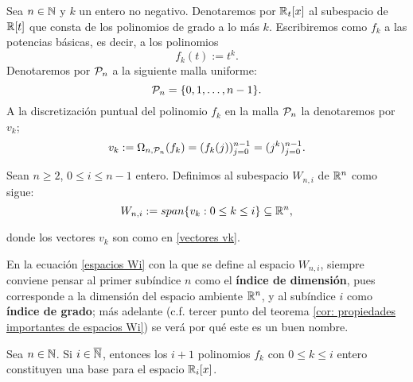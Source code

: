 \begin{notacion} \label{notacion: Pn, fk, Wi, vk}
Sea $n \in \mathbb{N}$ y $k$ un entero no negativo.
Denotaremos 
por $\mathbb{R}_{t}[x]$ al subespacio de $\mathbb{R}[t]$
que consta de los polinomios de grado a lo más $k$.
\noindent
Escribiremos como $f_{k}$ 
a las potencias básicas,
es decir, a los polinomios
\begin{equation}
\label{fk}
f_{k}(t):=t^{k}.
\end{equation}
Denotaremos por $\mathcal{P}_{n}$ a la siguiente
malla uniforme:
\begin{equation}
\label{malla Pn}
\mathcal{P}_{n}=\{ 0, 1, \ldots , n-1 \}.
\end{equation}
A la discretización puntual del
polinomio $f_{k}$ en la malla 
$\mathcal{P}_{n}$
la denotaremos por $v_{k}$;
\begin{equation}
\label{vectores vk}
v_{k}:= \Omega_{n, \mathcal{P}_{n}}(f_{k})
=(f_{k}(j))_{j=0}^{n-1}=(j^{k})_{j=0}^{n-1}.
\end{equation}
\end{notacion}

\begin{defi}
\label{def: espacis Wni}
Sean $n\geq 2$, $0 \leq i \leq n-1$ entero.
Definimos al subespacio 
$W_{n,i}$ de $\mathbb{R}^{n}$ como sigue:
\begin{equation}
\label{espacios Wi}
W_{n,i} := span\{ v_{k} : 0 \leq k \leq i \} \subseteq \mathbb{R}^{n},
\end{equation}

\noindent
donde los vectores $v_{k}$ son como en \ref{vectores vk}.
\end{defi}


En la ecuación \eqref{espacios Wi} con la que se
define al espacio $W_{n,i}$,
siempre conviene pensar al primer subíndice $n$
como el \textbf{índice de dimensión}, pues corresponde
a la dimensión del espacio ambiente $\mathbb{R}^{n}$,
y al subíndice $i$ como \textbf{índice de grado};
más adelante (c.f. tercer punto del teorema 
\ref{cor: propiedades importantes de espacios Wi}) 
se verá por qué este es un buen nombre.



\begin{obs} \label{obs:independencia lineal polinomios}
Sea $n \in \mathbb{N}$. Si $i \in \overline{\mathbb{N}}$, entonces
los $i+1$ polinomios
$f_{k}$ con $0 \leq k \leq i$ entero
constituyen una base para el espacio $\mathbb{R}_{i}[x]$.
\end{obs}



